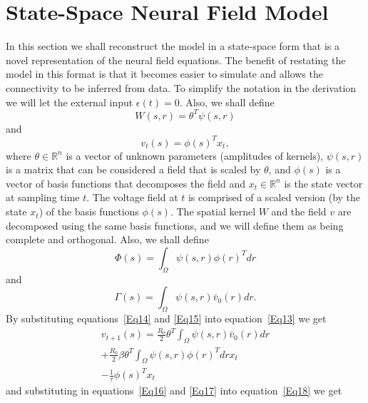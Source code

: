 \documentclass[onecolumn,draftcls]{IEEEtran}
\begin{document}
\section{State-Space Neural Field Model}
In this section we shall reconstruct the model in a state-space form that is a novel representation of the neural field equations. The benefit of restating the model in this format is that it becomes easier to simulate and allows the connectivity to be inferred from data. To simplify the notation in the derivation we will let the external input $\epsilon(t)=0$. Also, we shall define
\begin{equation}\label{Eq14}
W\left( {s,r} \right) = {\theta ^T}\psi \left( {s,r} \right)
\end{equation}
and
\begin{equation}\label{Eq15}
{v_t}\left( s \right) = \phi {\left( s \right)^T}{x_t},
\end{equation}
where $\theta \in \mathbb{R}^n$ is a vector of unknown parameters (amplitudes of kernels), $\psi(s,r)$ is a matrix that can be considered a field that is scaled by $\theta$, and $\phi(s)$ is a vector of basis functions that decomposes the field and $x_t \in\mathbb{R}^n$ is the state vector at sampling time $t$. The voltage field at $t$ is comprised of a scaled version (by the state $x_t$) of the basis functions $\phi(s)$.
 The spatial kernel $W$ and the field $v$ are decomposed using the same basis functions, and we will define them as being complete and orthogonal. Also, we shall define
\begin{equation}\label{Eq16}
\Phi \left( s \right) = \int_\Omega  {\psi \left( {s,r} \right)\phi {{\left( r \right)}^T}dr}
\end{equation}
and
\begin{equation}\label{Eq17}
\Gamma \left( s \right) = \int_\Omega  {\psi \left( {s,r} \right){{\bar v}_0}\left( r \right)dr}.
\end{equation}
By substituting equations~\ref{Eq14} and \ref{Eq15} into equation~\ref{Eq13} we get
\begin{align}\label{Eq18}
 {v_{t + 1}}\left( s \right) = \frac{{{R_0}}}{2}{\theta ^T}\int_\Omega  {\psi \left( {s,r} \right){{\bar v}_0}\left( r \right)dr} \nonumber \\
  + \frac{{{R_0}}}{2}\beta {\theta ^T}\int_\Omega  {\psi \left( {s,r} \right)\phi {{\left( r \right)}^T}dr} {x_t} \\
  - \frac{1}{\tau }\phi {\left( s \right)^T}{x_t} \nonumber
\end{align}
and substituting in equations~\ref{Eq16} and \ref{Eq17} into equation~\ref{Eq18} we get
\end{document}
